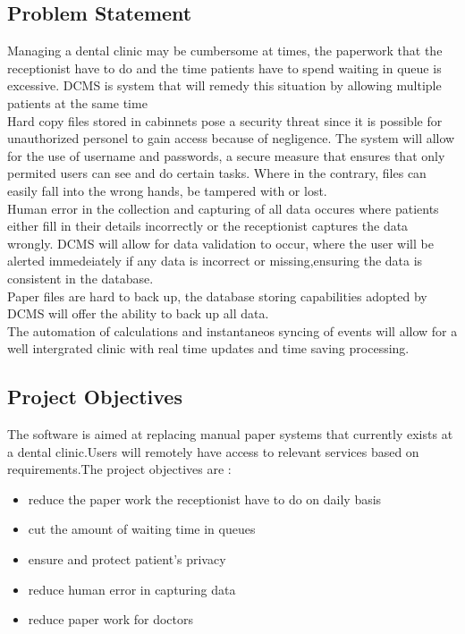 \documentclass[11 pt]{article}
\begin{document}
\subsection{Problem Statement}
Managing a dental clinic may be cumbersome at times, the paperwork that the receptionist have to do and the time  patients have to spend waiting in queue is excessive. DCMS is system that will remedy this situation by allowing multiple patients at the same time\\
Hard copy files stored in cabinnets pose a security threat since it is possible for unauthorized personel to gain access because of negligence. The system will allow for the use of username and passwords, a secure measure that ensures that only permited users can see and do certain tasks. Where in the contrary, files can easily fall into the wrong hands, be tampered with or lost.\\
Human error in the collection and capturing of all data occures where patients either fill in their details incorrectly or the receptionist captures the data wrongly. DCMS will allow for data validation to occur, where the user will be alerted immedeiately if any data is incorrect or missing,ensuring the data is consistent in the database.\\
Paper files are hard to back up, the database storing capabilities adopted by DCMS will offer the ability to back up all data. \\
The automation of calculations and instantaneos syncing of events will allow for a well intergrated clinic with real time updates and time saving processing.\subsection{Project Objectives }
The software is aimed at replacing manual paper systems that currently exists at a dental clinic.Users will remotely have access to relevant services based on requirements.The project objectives are :
\begin{itemize}
\item reduce the paper work the receptionist have to do on daily basis
\item cut the amount of waiting time in queues
\item ensure and protect patient's privacy
\item reduce human error in capturing data
\item reduce paper work for doctors
\end{itemize}
\end{document}
